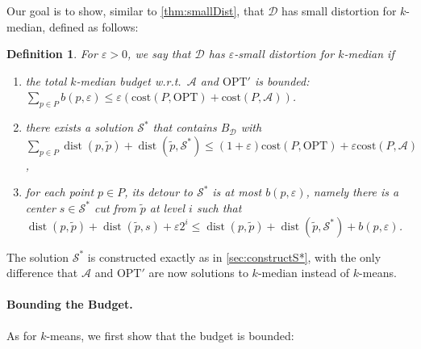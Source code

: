 \documentclass[11pt]{article}
\newtheorem{definition}[theorem]{Definition}
\newcommand{\opt}{\text{OPT}}
\newcommand{\eps}{\varepsilon}
\newcommand{\cost}{\mathrm{cost}}
\renewcommand{\tilde}{\widetilde}
\newcommand{\calD}{\mathcal {D}}
\newcommand{\calS}{\mathcal {S}}
\newcommand{\calL}{\mathcal{A}}
\DeclareMathOperator{\dist}{dist}
\begin{document}
Our goal is to show, similar to \cref{thm:smallDist}, that $\calD$ has small distortion for $k$-median, defined as follows:
\begin{definition}\label{def:smallDistKmed}
For $\eps  > 0$, we say that $\calD$ has $\eps$-\emph{small distortion} for $k$-median if 
\begin{enumerate}
\item\label{prop:budgetKmed} the total $k$-median budget w.r.t.\ $\calL$ and $\opt'$ is bounded: $\sum_{p \in P} b(p, \eps) \leq \eps (\cost(P, \opt) + \cost(P, \calL))$.
\item\label{prop:costSstarKmed} there exists a solution $ \calS^*$ that contains $B_{\calD}$ 
with $\sum_{p \in P}  \dist(p, \tilde p) + \dist(\tilde p,  \calS^*) \leq (1+\eps)\cost(P, \opt) + \eps \cost(P, \calL)$,
\item\label{prop:detKmed} for each point $p \in P$, its detour to $\calS^*$ is at most $b(p, \eps)$, namely there is a center $s \in \calS^*$ cut from $\tilde p$ at level $i$ such that $\dist(p, \tilde p) + \dist(\tilde p, s) + \eps 2^i \leq \dist(p, \tilde p) + \dist(\tilde p, \calS^*) + b(p, \eps)$.
\end{enumerate}
\end{definition}

The solution $\calS^*$ is constructed exactly as in \cref{sec:constructS*}, with the only difference that $\calL$ and $\opt'$ are now solutions to $k$-median instead of $k$-means.

\paragraph{Bounding the Budget.}

As for $k$-means, we first show that the budget is bounded:
\end{document}
